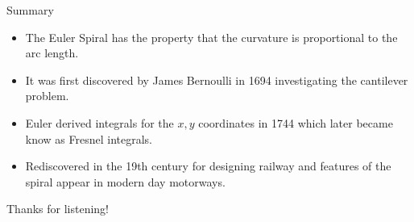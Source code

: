 \documentclass{beamer}
\begin{document}
\begin{frame}{Summary}
	\begin{itemize}
		\item The Euler Spiral has the property that the curvature is proportional to the arc length.
		\item It was first discovered by James Bernoulli in 1694 investigating the cantilever problem.
		\item Euler derived integrals for the $x,y$ coordinates in 1744 which later became know as Fresnel integrals.
		\item Rediscovered in the 19th century for designing railway and features of the spiral appear in modern day motorways.
	\end{itemize}
\end{frame}

\begin{frame}
	\centering
	Thanks for listening!
	
\end{frame}
\end{document}

